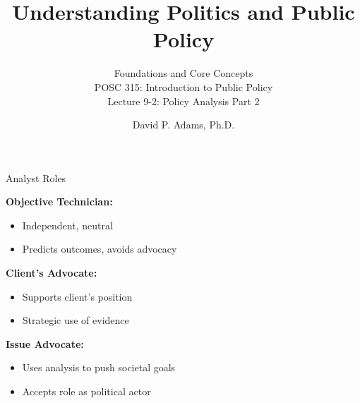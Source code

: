 \documentclass[10pt]{beamer}
\begin{document}
\title{Understanding Politics and Public Policy}
\subtitle{Foundations and Core Concepts\\POSC 315: Introduction to Public Policy\\Lecture 9-2: Policy Analysis Part 2}
\date{David P. Adams, Ph.D.}

\maketitle


\begin{frame}{Analyst Roles}

\begin{block}{}
    \textbf{Objective Technician:}
    \begin{itemize}
        \item Independent, neutral
        \item Predicts outcomes, avoids advocacy
    \end{itemize}

    \textbf{Client's Advocate:}
    \begin{itemize}
        \item Supports client's position
        \item Strategic use of evidence
    \end{itemize}

    \textbf{Issue Advocate:}
    \begin{itemize}
        \item Uses analysis to push societal goals
        \item Accepts role as political actor
    \end{itemize}
\end{block}


\end{frame}
\end{document}
